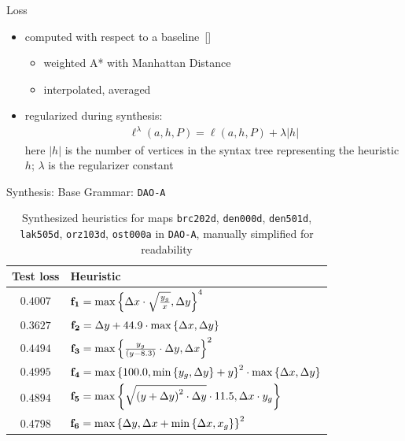 \documentclass[aspectratio=169,usenames,dvipsnames]{beamer}
\newcommand{\bea}{\begin{eqnarray}}
\newcommand{\eea}{\end{eqnarray}}
\newcommand{\bei}{\begin{itemize}}
\newcommand{\eei}{\end{itemize}}
\newcommand{\ie}{\item}
\renewcommand{\max}{\operatornamewithlimits{max}\limits}
\numberwithin{equation}{section}
\numberwithin{theorem}{section}
\numberwithin{lem}{section}
\numberwithin{df}{section}
\begin{document}

\begin{frame}{Loss}

\bei

\ie computed with respect to a baseline~[\cite{cog2021short}]
\bei
\ie weighted A* with Manhattan Distance
\ie interpolated, averaged
\eei

\bigskip

\ie regularized during synthesis:
\bea
\ell^\lambda(a,h,P) = \ell(a,h,P) + \lambda |h|\nonumber
\eea 
here $|h|$ is the number of vertices in the syntax tree representing the heuristic $h$; $\lambda$ is the regularizer constant

\eei


\end{frame}



\begin{frame}{Synthesis: Base Grammar: {\tt DAO-A}}

\begin{table}[htbp]
 \setlength{\tabcolsep}{3pt}
	\centering
	{
		\begin{tabular}{c|l}
			\toprule
			{\bf Test loss} & {\bf Heuristic}\\
			\midrule
			$0.4007$ & 
			$\mathbf{f_{1}} = \max\left\{\Delta x \cdot \sqrt{\frac{y_g}{x}},\Delta y\right\}^4$\\
			$0.3627$ & 
			$\mathbf{f_{2}} = \Delta y + 44.9 \cdot \max\left\{\Delta x,\Delta y\right\}$\\
			$0.4494$ & 
			$\mathbf{f_{3}} = \max\left\{\frac{y_g}{\left(y - 8.3\right)} \cdot \Delta y,\Delta x\right\}^2$\\
			$0.4995$ & 
			$\mathbf{f_{4}} = \max\left\{100.0,\min\left\{y_g,\Delta y\right\} + y\right\}^2 \cdot \max\left\{\Delta x,\Delta y\right\}$\\
			$0.4894$ & 
			$\mathbf{f_{5}} = \max\left\{\sqrt{\left(y + \Delta y\right)^2 \cdot \Delta y} \cdot 11.5,\Delta x \cdot y_g\right\}$\\
			$0.4798$ & 
			$\mathbf{f_{6}} = \max\left\{\Delta y,\Delta x + \min\left\{\Delta x,x_g\right\}\right\}^2$\\
			\bottomrule
		\end{tabular}}
	\caption{Synthesized heuristics for maps {\tt brc202d}, {\tt den000d}, {\tt den501d}, {\tt lak505d}, {\tt orz103d}, {\tt ost000a} in {\tt DAO-A}, manually simplified for readability}
	\label{tab:building_blocks_from_DAO-A}
\end{table}


\end{frame}
\end{document}
